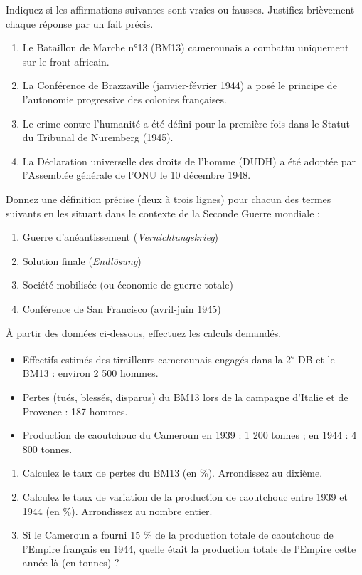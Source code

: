 \documentclass[11pt]{article}
\begin{document}
\begin{exercice}
Indiquez si les affirmations suivantes sont vraies ou fausses. Justifiez brièvement chaque réponse par un fait précis.
\begin{enumerate}
\item Le Bataillon de Marche n°13 (BM13) camerounais a combattu uniquement sur le front africain.
\item La Conférence de Brazzaville (janvier-février 1944) a posé le principe de l'autonomie progressive des colonies françaises.
\item Le crime contre l'humanité a été défini pour la première fois dans le Statut du Tribunal de Nuremberg (1945).
\item La Déclaration universelle des droits de l'homme (DUDH) a été adoptée par l'Assemblée générale de l'ONU le 10 décembre 1948.
\end{enumerate}
\end{exercice}

\begin{exercice}
Donnez une définition précise (deux à trois lignes) pour chacun des termes suivants en les situant dans le contexte de la Seconde Guerre mondiale :
\begin{enumerate}
\item Guerre d'anéantissement (\emph{Vernichtungskrieg})
\item Solution finale (\emph{Endlösung})
\item Société mobilisée (ou économie de guerre totale)
\item Conférence de San Francisco (avril-juin 1945)
\end{enumerate}
\end{exercice}

\begin{exercice}
À partir des données ci-dessous, effectuez les calculs demandés.
\begin{itemize}
\item Effectifs estimés des tirailleurs camerounais engagés dans la 2\textsuperscript{e} DB et le BM13 : environ 2 500 hommes.
\item Pertes (tués, blessés, disparus) du BM13 lors de la campagne d'Italie et de Provence : 187 hommes.
\item Production de caoutchouc du Cameroun en 1939 : 1 200 tonnes ; en 1944 : 4 800 tonnes.
\end{itemize}
\begin{enumerate}
\item Calculez le taux de pertes du BM13 (en \%). Arrondissez au dixième.
\item Calculez le taux de variation de la production de caoutchouc entre 1939 et 1944 (en \%). Arrondissez au nombre entier.
\item Si le Cameroun a fourni 15 \% de la production totale de caoutchouc de l'Empire français en 1944, quelle était la production totale de l'Empire cette année-là (en tonnes) ?
\end{enumerate}
\end{exercice}
\end{document}
